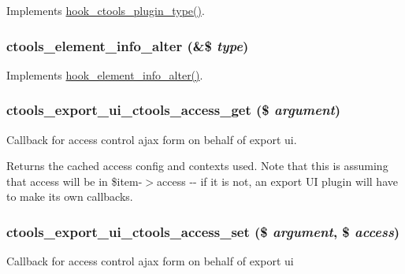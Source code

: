\label{ctools_8module_a76a9ad5ac309f0526af308e38aa3f574}
Implements \hyperlink{group__hooks_gacb27d27849a3374ddda0120603d549ac}{hook\_\-ctools\_\-plugin\_\-type()}. \hypertarget{ctools_8module_a555fb0b73704f629803ed07eff93f97d}{
\subsubsection[{ctools\_\-element\_\-info\_\-alter}]{\setlength{\rightskip}{0pt plus 5cm}ctools\_\-element\_\-info\_\-alter (\&\$ {\em type})}}
\label{ctools_8module_a555fb0b73704f629803ed07eff93f97d}
Implements \hyperlink{group__hooks_gaf83b34170f31d93a7cfed56afa60007a}{hook\_\-element\_\-info\_\-alter()}. \hypertarget{ctools_8module_a60ede52adc0e36252c48a28946187ca9}{
\subsubsection[{ctools\_\-export\_\-ui\_\-ctools\_\-access\_\-get}]{\setlength{\rightskip}{0pt plus 5cm}ctools\_\-export\_\-ui\_\-ctools\_\-access\_\-get (\$ {\em argument})}}
\label{ctools_8module_a60ede52adc0e36252c48a28946187ca9}
Callback for access control ajax form on behalf of export ui.

Returns the cached access config and contexts used. Note that this is assuming that access will be in \$item-\/$>$access -\/-\/ if it is not, an export UI plugin will have to make its own callbacks. \hypertarget{ctools_8module_a816f35c4e895c69befa4afd787324880}{
\subsubsection[{ctools\_\-export\_\-ui\_\-ctools\_\-access\_\-set}]{\setlength{\rightskip}{0pt plus 5cm}ctools\_\-export\_\-ui\_\-ctools\_\-access\_\-set (\$ {\em argument}, \/  \$ {\em access})}}
\label{ctools_8module_a816f35c4e895c69befa4afd787324880}
Callback for access control ajax form on behalf of export ui

